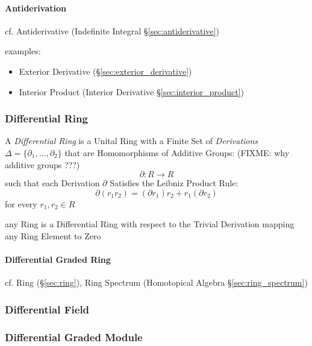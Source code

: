 \paragraph{Antiderivation}\label{sec:antiderivation}\hfill

cf. Antiderivative (Indefinite Integral \S\ref{sec:antiderivative})

examples:
\begin{itemize}
  \item Exterior Derivative (\S\ref{sec:exterior_derivative})
  \item Interior Product (Interior Derivative \S\ref{sec:interior_product})
\end{itemize}



\subsubsection{Differential Ring}\label{sec:differential_ring}

A \emph{Differential Ring} is a Unital Ring with a Finite Set of
\emph{Derivations} $\Delta = \{ \partial_1, \ldots, \partial_2 \}$ that are
Homomorphisms of Additive Groups: (FIXME: why additive groups ???)
\[
  \partial : R \rightarrow R
\]
such that each Derivation $\partial$ Satisfies the Leibniz Product Rule:
\[
  \partial(r_1r_2) = (\partial{r_1})r_2 + r_1(\partial{r_2})
\]
for every $r_1, r_2 \in R$


any Ring is a Differential Ring with respect to the Trivial Derivation mapping
any Ring Element to Zero



\paragraph{Differential Graded Ring}\label{sec:differential_graded_ring}\hfill

cf. Ring (\S\ref{sec:ring}), Ring Spectrum (Homotopical Algebra
\S\ref{sec:ring_spectrum})



\subsubsection{Differential Field}\label{sec:differential_field}

\subsubsection{Differential Graded Module}\label{sec:differential_graded_module}

